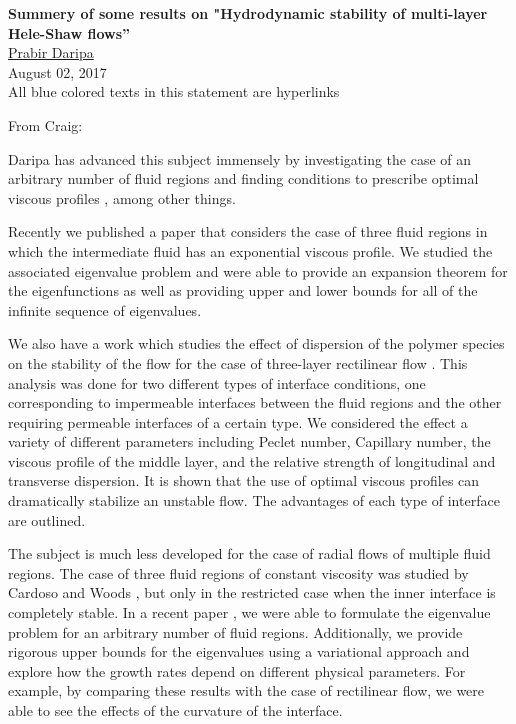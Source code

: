 \documentclass[10pt]{article}
\begin{document}
\begin{center}
	{\large\bf Summery of some results on "Hydrodynamic stability of multi-layer Hele-Shaw flows''} \\
	\medskip
	\href{http://www.math.tamu.edu/~daripa}{Prabir Daripa} \\
	August 02, 2017\\
	All blue colored texts in this statement are hyperlinks
\end{center}
\bigskip

From Craig:

Daripa has advanced this subject immensely by investigating the case of an arbitrary number of fluid regions \cite{daripa08:multi-layer} and finding conditions to prescribe optimal viscous profiles \cite{daripa:tipm2013}, among other things.

Recently we published a paper \cite{gin-daripa:hs-rect} that considers the case of three fluid regions in which the intermediate fluid has an exponential viscous profile. We studied the associated eigenvalue problem and were able to provide an expansion theorem for the eigenfunctions as well as providing upper and lower bounds for all of the infinite sequence of eigenvalues.

We also have a work which studies the effect of dispersion of the polymer species on the stability of the flow for the case of three-layer rectilinear flow \cite{daripa-gin:dispersion}. This analysis was done for two different types of interface conditions, one corresponding to impermeable interfaces between the fluid regions and the other requiring permeable interfaces of a certain type. We considered the effect a variety of different parameters including Peclet number, Capillary number, the viscous profile of the middle layer, and the relative strength of longitudinal and transverse dispersion. It is shown that the use of optimal viscous profiles can dramatically stabilize an unstable flow. The advantages of each type of interface are outlined.

The subject is much less developed for the case of radial flows of multiple fluid regions. The case of three fluid regions of constant viscosity was studied by Cardoso and Woods \cite{Cardoso/Woods:1995}, but only in the restricted case when the inner interface is completely stable. In a recent paper \cite{gin-daripa:hs-rad}, we were able to formulate the eigenvalue problem for an arbitrary number of fluid regions. Additionally, we provide rigorous upper bounds for the eigenvalues using a variational approach and explore how the growth rates depend on different physical parameters. For example, by comparing these results with the case of rectilinear flow, we were able to see the effects of the curvature of the interface.
\end{document}
